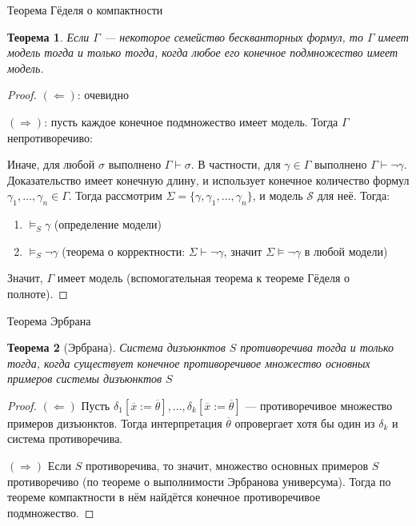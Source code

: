 \documentclass[handout]{beamer}
\newtheorem{thm}{Теорема}[section]
\begin{document}
\begin{frame}{Теорема Гёделя о компактности}
\begin{thm}Если $\Gamma$ --- некоторое семейство бескванторных формул, то $\Gamma$ имеет модель
тогда и только тогда, когда любое его конечное подмножество имеет модель.\end{thm}
\begin{proof}
$(\Leftarrow)$: очевидно

$(\Rightarrow)$: пусть каждое конечное подмножество имеет модель. Тогда $\Gamma$ непротиворечиво:

{\footnotesize Иначе, для любой $\sigma$ выполнено $\Gamma\vdash\sigma$. В частности, для $\gamma\in\Gamma$
выполнено $\Gamma\vdash\neg\gamma$. Доказательство имеет конечную длину, и использует конечное
количество формул $\gamma_1,\dots,\gamma_n\in\Gamma$. Тогда рассмотрим $\Sigma = \{\gamma,\gamma_1,\dots,\gamma_n\}$, 
и модель $\mathcal{S}$ для неё. Тогда:
\begin{enumerate}
\item $\models_{S}\gamma$ (определение модели)
\item $\models_{S}\neg\gamma$ (теорема о корректности: $\Sigma\vdash\neg\gamma$, значит $\Sigma\models\neg\gamma$ в любой модели)
\end{enumerate}}

Значит, $\Gamma$ имеет модель (вспомогательная теорема к теореме Гёделя о полноте).
\end{proof}
\end{frame}

\begin{frame}{Теорема Эрбрана}
\begin{thm}[Эрбрана]Система дизъюнктов $S$ противоречива тогда и только тогда, когда существует
конечное противоречивое множество основных примеров системы дизъюнктов $S$\end{thm}
\begin{proof}$(\Leftarrow)$ 
Пусть $\delta_1[\overline{x} := \overline{\theta}],\dots,\delta_k[\overline{x} := \overline{\theta}]$ 
--- противоречивое множество примеров дизъюнктов. Тогда интерпретация $\overline{\theta}$
опровергает хотя бы один из $\delta_k$ и система противоречива.

$(\Rightarrow)$ Если $S$ противоречива, то значит, множество основных примеров $S$
противоречиво (по теореме о выполнимости Эрбранова универсума). Тогда по теореме компактности
в нём найдётся конечное противоречивое подмножество.
\end{proof}
\end{frame}
\end{document}
